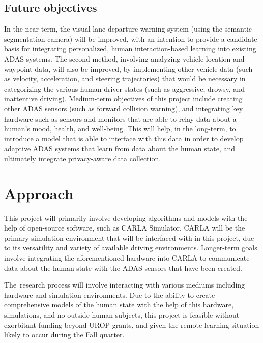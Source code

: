 \documentclass[12pt]{article}
\renewcommand{\_}{\kern-1.5pt\textunderscore\kern-1.5pt}
\begin{document}
\subsection{Future objectives}
In the near-term, the visual lane departure warning system (using the semantic segmentation camera) will be improved, with an intention to provide a candidate basis for integrating personalized, human interaction-based learning into existing ADAS systems. The second method, involving analyzing vehicle location and waypoint data, will also be improved, by implementing other vehicle data (such as velocity, acceleration, and steering trajectories) that would be necessary in categorizing the various human driver states (such as aggressive, drowsy, and inattentive driving). Medium-term objectives of this project include creating other ADAS sensors (such as forward collision warning), and integrating key hardware such as sensors and monitors that are able to relay data about a human’s mood, health, and well-being. This will help, in the long-term, to introduce a model that is able to interface with this data in order to develop adaptive ADAS systems that learn from data about the human state, and ultimately integrate privacy-aware data collection.\par

\section{Approach}
This project will primarily involve developing algorithms and models with the help of open-source software, such as CARLA Simulator. CARLA will be the primary simulation environment that will be interfaced with in this project, due to its versatility and variety of available driving environments. Longer-term goals involve integrating the aforementioned hardware into CARLA to communicate data about the human state with the ADAS sensors that have been created. \par


\vspace{\baselineskip}
The\ research process will involve interacting with various mediums including hardware and  simulation environments. Due to the ability to create comprehensive models of the human state with the help of this hardware, simulations, and no outside human subjects, this project is feasible without exorbitant funding beyond UROP grants, and given the remote learning situation likely to occur during the Fall quarter. \par
\end{document}
